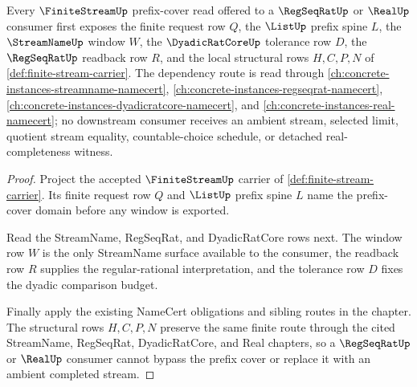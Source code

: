 \begin{theorem}
\label{thm:finite-stream-prefix-cover-determinacy}
Every $\FiniteStreamUp$ prefix-cover read offered to a $\RegSeqRatUp$ or $\RealUp$ consumer first exposes the finite request row $Q$, the $\ListUp$ prefix spine $L$, the $\StreamNameUp$ window $W$, the $\DyadicRatCoreUp$ tolerance row $D$, the $\RegSeqRatUp$ readback row $R$, and the local structural rows $H,C,P,N$ of \autoref{def:finite-stream-carrier}. The dependency route is read through \autoref{ch:concrete-instances-streamname-namecert}, \autoref{ch:concrete-instances-regseqrat-namecert}, \autoref{ch:concrete-instances-dyadicratcore-namecert}, and \autoref{ch:concrete-instances-real-namecert}; no downstream consumer receives an ambient stream, selected limit, quotient stream equality, countable-choice schedule, or detached real-completeness witness.
\end{theorem}
\begin{proof}
Project the accepted $\FiniteStreamUp$ carrier of \autoref{def:finite-stream-carrier}. Its finite request row $Q$ and $\ListUp$ prefix spine $L$ name the prefix-cover domain before any window is exported.

Read the StreamName, RegSeqRat, and DyadicRatCore rows next. The window row $W$ is the only StreamName surface available to the consumer, the readback row $R$ supplies the regular-rational interpretation, and the tolerance row $D$ fixes the dyadic comparison budget.

Finally apply the existing NameCert obligations and sibling routes in the chapter. The structural rows $H,C,P,N$ preserve the same finite route through the cited StreamName, RegSeqRat, DyadicRatCore, and Real chapters, so a $\RegSeqRatUp$ or $\RealUp$ consumer cannot bypass the prefix cover or replace it with an ambient completed stream.
\end{proof}
